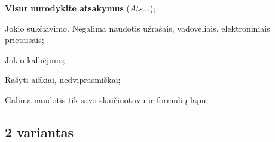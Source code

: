 \documentclass[a4paper]{article}
\begin{document}
\begin{small}
      \begin{enumerate*}[label={(\arabic*)}]
            \item \textbf{Visur} \textbf{nurodykite atsakymus} ($Ats\ldots$);
            \item Jokio sukčiavimo. Negalima naudotis užrašais, vadovėliais, elektroniniais
                  prietaisais;
            \item Jokio kalbėjimo;
            \item Rašyti aiškiai, nedviprasmiškai;
            \item Galima naudotis tik savo skaičiuotuvu ir formulių lapu;
      \end{enumerate*}
\end{small}


\subsection*{2 variantas}
\end{document}
